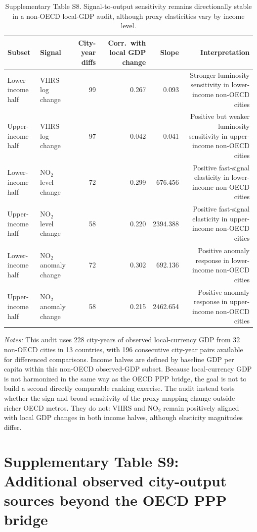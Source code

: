 \documentclass[oneside,pdflatex,sn-nature]{sn-jnl}
\begin{document}
\begin{table}[H]
\centering
\caption{Supplementary Table S8. Signal-to-output sensitivity remains directionally stable in a non-OECD local-GDP audit, although proxy elasticities vary by income level.}
\small
\setlength{\tabcolsep}{4pt}
\begin{tabular}{p{}p{}rrrr}
\toprule
Subset & Signal & City-year diffs & Corr.\ with local GDP change & Slope & Interpretation \\
\midrule
Lower-income half & VIIRS log change & 99 & 0.267 & 0.093 & Stronger luminosity sensitivity in lower-income non-OECD cities \\
Upper-income half & VIIRS log change & 97 & 0.042 & 0.041 & Positive but weaker luminosity sensitivity in upper-income non-OECD cities \\
Lower-income half & NO$_2$ level change & 72 & 0.299 & 676.456 & Positive fast-signal elasticity in lower-income non-OECD cities \\
Upper-income half & NO$_2$ level change & 58 & 0.220 & 2394.388 & Positive fast-signal elasticity in upper-income non-OECD cities \\
Lower-income half & NO$_2$ anomaly change & 72 & 0.302 & 692.136 & Positive anomaly response in lower-income non-OECD cities \\
Upper-income half & NO$_2$ anomaly change & 58 & 0.215 & 2462.654 & Positive anomaly response in upper-income non-OECD cities \\
\bottomrule
\end{tabular}
\end{table}
\FloatBarrier

\noindent\textit{Notes:} This audit uses 228 city-years of observed local-currency GDP from 32 non-OECD cities in 13 countries, with 196 consecutive city-year pairs available for differenced comparisons. Income halves are defined by baseline GDP per capita within this non-OECD observed-GDP subset. Because local-currency GDP is not harmonized in the same way as the OECD PPP bridge, the goal is not to build a second directly comparable ranking exercise. The audit instead tests whether the sign and broad sensitivity of the proxy mapping change outside richer OECD metros. They do not: VIIRS and NO$_2$ remain positively aligned with local GDP changes in both income halves, although elasticity magnitudes differ.

\section{Supplementary Table S9: Additional observed city-output sources beyond the OECD PPP bridge}
\end{document}

